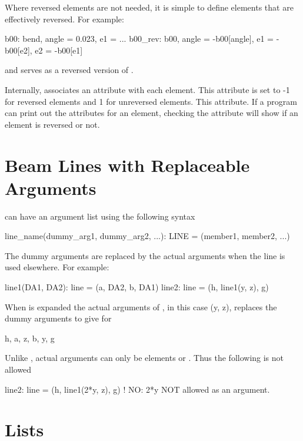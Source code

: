 Where reversed elements are not needed, it is simple to define elements that are
effectively reversed. For example:
\begin{example}
  b00: bend, angle = 0.023, e1 = ...
  b00_rev: b00, angle = -b00[angle], e1 = -b00[e2], e2 = -b00[e1]
\end{example}
and  serves as a reversed version of .

Internally, \bmad associates an  attribute with each element. This attribute is set
to -1 for reversed elements and 1 for unreversed elements. This attribute. If a program can print
out the attributes for an element, checking the  attribute will show if an element
is reversed or not.

\section{Beam Lines with Replaceable Arguments}
\label{s:lines.with.arg}

 can have an argument list using the following syntax
\begin{example}
  line_name(dummy_arg1, dummy_arg2, ...): LINE = (member1, member2, ...)
\end{example}
The dummy arguments are replaced by the actual arguments when the line is used
elsewhere. For example:
\begin{example}
  line1(DA1, DA2): line = (a, DA2, b, DA1)
  line2: line = (h, line1(y, z), g)
\end{example}
When  is expanded the actual arguments of , in this case \vn(y, z), replaces the
dummy arguments  to give for 
\begin{example}
  h, a, z, b, y, g
\end{example} 
Unlike \mad,  actual arguments can only be elements or . 
Thus the following is not allowed
\begin{example}
  line2: line = (h, line1(2*y, z), g)   ! NO: 2*y NOT allowed as an argument.
\end{example}

\section{Lists}
\label{s:replace.list}

